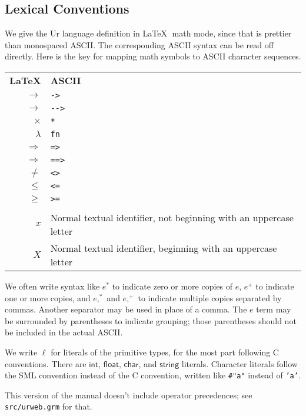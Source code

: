 \documentclass{article}
\newcommand{\cd}[1]{\texttt{#1}}
\newcommand{\mt}[1]{\mathsf{#1}}
\begin{document}
\subsection{Lexical Conventions}

We give the Ur language definition in \LaTeX $\;$ math mode, since that is prettier than monospaced ASCII.  The corresponding ASCII syntax can be read off directly.  Here is the key for mapping math symbols to ASCII character sequences.

\begin{center}
  \begin{tabular}{rl}
    \textbf{\LaTeX} & \textbf{ASCII} \\
    $\to$ & \cd{->} \\
    $\longrightarrow$ & \cd{-{}->} \\
    $\times$ & \cd{*} \\
    $\lambda$ & \cd{fn} \\
    $\Rightarrow$ & \cd{=>} \\
    $\Longrightarrow$ & \cd{==>} \\
    $\neq$ & \cd{<>} \\
    $\leq$ & \cd{<=} \\
    $\geq$ & \cd{>=} \\
    \\
    $x$ & Normal textual identifier, not beginning with an uppercase letter \\
    $X$ & Normal textual identifier, beginning with an uppercase letter \\
  \end{tabular}
\end{center}

We often write syntax like $e^*$ to indicate zero or more copies of $e$, $e^+$ to indicate one or more copies, and $e,^*$ and $e,^+$ to indicate multiple copies separated by commas.  Another separator may be used in place of a comma.  The $e$ term may be surrounded by parentheses to indicate grouping; those parentheses should not be included in the actual ASCII.

We write $\ell$ for literals of the primitive types, for the most part following C conventions.  There are $\mt{int}$, $\mt{float}$, $\mt{char}$, and $\mt{string}$ literals.  Character literals follow the SML convention instead of the C convention, written like \texttt{\#"a"} instead of \texttt{'a'}.

This version of the manual doesn't include operator precedences; see \texttt{src/urweb.grm} for that.
\end{document}
